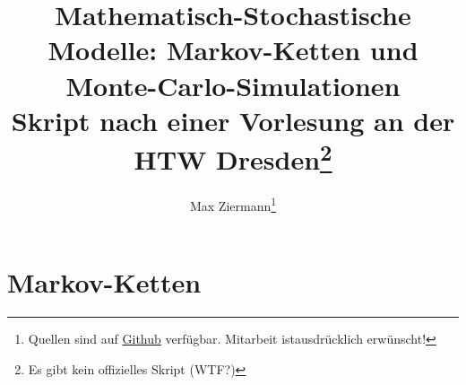 \documentclass{report}
\title{%
\huge\textbf{Mathematisch-Stochastische Modelle: Markov-Ketten und Monte-Carlo-Simulationen} \\
[2em]\large Skript nach einer Vorlesung an der HTW Dresden\thanks{Es gibt kein
offizielles Skript (WTF?)}}
\author{Max Ziermann\thanks{Quellen sind auf \href{https://github.com/burrscurr/msm}
{Github} verfügbar. Mitarbeit istausdrücklich erwünscht!}}
\theoremstyle{lemmastyle}
\begin{document}
  \maketitle

  \tableofcontents

  
  
  

  \chapter{Markov-Ketten}
  
  

  \printbibliography
\end{document}
